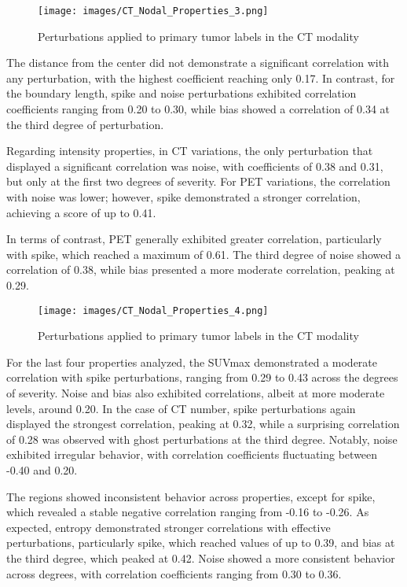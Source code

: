 \begin{figure}[ht]
    \centering
    \texttt{[image: images/CT\_Nodal\_Properties\_3.png]}
    \caption{Perturbations applied to primary tumor labels in the CT modality}
    \label{fig:three_subfigures}
\end{figure}

The distance from the center did not demonstrate a significant correlation with any perturbation, with the highest coefficient reaching only 0.17. In contrast, for the boundary length, spike and noise perturbations exhibited correlation coefficients ranging from 0.20 to 0.30, while bias showed a correlation of 0.34 at the third degree of perturbation.

Regarding intensity properties, in CT variations, the only perturbation that displayed a significant correlation was noise, with coefficients of 0.38 and 0.31, but only at the first two degrees of severity. For PET variations, the correlation with noise was lower; however, spike demonstrated a stronger correlation, achieving a score of up to 0.41.

In terms of contrast, PET generally exhibited greater correlation, particularly with spike, which reached a maximum of 0.61. The third degree of noise showed a correlation of 0.38, while bias presented a more moderate correlation, peaking at 0.29.
\begin{figure}[ht]
    \centering
    \texttt{[image: images/CT\_Nodal\_Properties\_4.png]}
    \caption{Perturbations applied to primary tumor labels in the CT modality}
    \label{fig:three_subfigures}
\end{figure}

For the last four properties analyzed, the SUVmax demonstrated a moderate correlation with spike perturbations, ranging from 0.29 to 0.43 across the degrees of severity. Noise and bias also exhibited correlations, albeit at more moderate levels, around 0.20. In the case of CT number, spike perturbations again displayed the strongest correlation, peaking at 0.32, while a surprising correlation of 0.28 was observed with ghost perturbations at the third degree. Notably, noise exhibited irregular behavior, with correlation coefficients fluctuating between -0.40 and 0.20.

The regions showed inconsistent behavior across properties, except for spike, which revealed a stable negative correlation ranging from -0.16 to -0.26. As expected, entropy demonstrated stronger correlations with effective perturbations, particularly spike, which reached values of up to 0.39, and bias at the third degree, which peaked at 0.42. Noise showed a more consistent behavior across degrees, with correlation coefficients ranging from 0.30 to 0.36.


